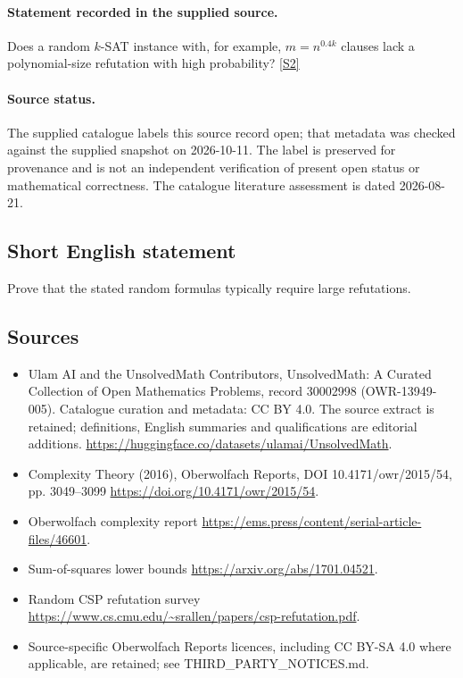 \documentclass[11pt]{article}
\begin{document}
\paragraph{Statement recorded in the supplied source.}
Does a random $k$-SAT instance with, for example, $m=n^{0.4k}$ clauses lack a polynomial-size refutation with high probability? \href{https://doi.org/10.4171/owr/2015/54}{[S2]}
\paragraph{Source status.}
The supplied catalogue labels this source record open; that metadata was checked against the supplied snapshot on 2026-10-11. The label is preserved for provenance and is not an independent verification of present open status or mathematical correctness. The catalogue literature assessment is dated 2026-08-21.
\subsection{Short English statement}
Prove that the stated random formulas typically require large refutations.
\subsection{Sources}
\begin{itemize}
\item[S1] Ulam AI and the UnsolvedMath Contributors, UnsolvedMath: A Curated Collection of Open Mathematics Problems, record 30002998 (OWR-13949-005). Catalogue curation and metadata: CC BY 4.0. The source extract is retained; definitions, English summaries and qualifications are editorial additions.
\url{https://huggingface.co/datasets/ulamai/UnsolvedMath}.
\item[S2] Complexity Theory (2016), Oberwolfach Reports, DOI 10.4171/owr/2015/54, pp. 3049--3099
\url{https://doi.org/10.4171/owr/2015/54}.
\item[S3] Oberwolfach complexity report
\url{https://ems.press/content/serial-article-files/46601}.
\item[S4] Sum-of-squares lower bounds
\url{https://arxiv.org/abs/1701.04521}.
\item[S5] Random CSP refutation survey
\url{https://www.cs.cmu.edu/~srallen/papers/csp-refutation.pdf}.
\item Source-specific Oberwolfach Reports licences, including CC BY-SA 4.0 where applicable, are retained; see THIRD\_PARTY\_NOTICES.md.
\end{itemize}
\end{document}
